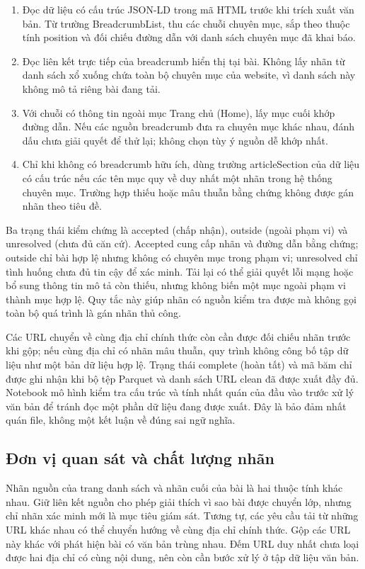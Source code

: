 \begin{enumerate}[leftmargin=1.6em]
\item Đọc dữ liệu có cấu trúc JSON-LD trong mã HTML trước khi trích xuất văn bản. Từ trường BreadcrumbList, thu các chuỗi chuyên mục, sắp theo thuộc tính position và đối chiếu đường dẫn với danh sách chuyên mục đã khai báo.
\item Đọc liên kết trực tiếp của breadcrumb hiển thị tại bài. Không lấy nhãn từ danh sách xổ xuống chứa toàn bộ chuyên mục của website, vì danh sách này không mô tả riêng bài đang tải.
\item Với chuỗi có thông tin ngoài mục Trang chủ (Home), lấy mục cuối khớp đường dẫn. Nếu các nguồn breadcrumb đưa ra chuyên mục khác nhau, đánh dấu chưa giải quyết để thử lại; không chọn tùy ý nguồn dễ khớp nhất.
\item Chỉ khi không có breadcrumb hữu ích, dùng trường articleSection của dữ liệu có cấu trúc nếu các tên mục quy về duy nhất một nhãn trong hệ thống chuyên mục. Trường hợp thiếu hoặc mâu thuẫn bằng chứng không được gán nhãn theo tiêu đề.
\end{enumerate}
Ba trạng thái kiểm chứng là accepted (chấp nhận), outside (ngoài phạm vi) và unresolved (chưa đủ căn cứ). Accepted cung cấp nhãn và đường dẫn bằng chứng; outside chỉ bài hợp lệ nhưng không có chuyên mục trong phạm vi; unresolved chỉ tình huống chưa đủ tin cậy để xác minh. Tải lại có thể giải quyết lỗi mạng hoặc bổ sung thông tin mô tả còn thiếu, nhưng không biến một mục ngoài phạm vi thành mục hợp lệ. Quy tắc này giúp nhãn có nguồn kiểm tra được mà không gọi toàn bộ quá trình là gán nhãn thủ công.

Các URL chuyển về cùng địa chỉ chính thức còn cần được đối chiếu nhãn trước khi gộp; nếu cùng địa chỉ có nhãn mâu thuẫn, quy trình không công bố tập dữ liệu như một bản dữ liệu hợp lệ. Trạng thái complete (hoàn tất) và mã băm chỉ được ghi nhận khi bộ tệp Parquet và danh sách URL clean đã được xuất đầy đủ. Notebook mô hình kiểm tra cấu trúc và tính nhất quán của đầu vào trước xử lý văn bản để tránh đọc một phần dữ liệu đang được xuất. Đây là bảo đảm nhất quán file, không một kết luận về đúng sai ngữ nghĩa.


\subsection{Đơn vị quan sát và chất lượng nhãn}
Nhãn nguồn của trang danh sách và nhãn cuối của bài là hai thuộc tính khác nhau. Giữ liên kết nguồn cho phép giải thích vì sao bài được chuyển lớp, nhưng chỉ nhãn xác minh mới là mục tiêu giám sát. Tương tự, các yêu cầu tải từ những URL khác nhau có thể chuyển hướng về cùng địa chỉ chính thức. Gộp các URL này khác với phát hiện bài có văn bản trùng nhau. Đếm URL duy nhất chưa loại được hai địa chỉ có cùng nội dung, nên còn cần bước xử lý ở tập dữ liệu văn bản.

